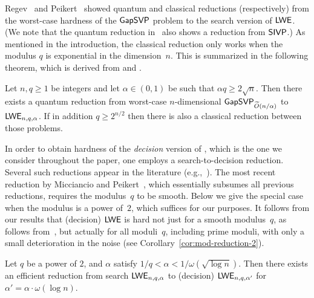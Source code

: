 Regev~\cite{DBLP:journals/jacm/Regev09} and Peikert~\cite{DBLP:conf/stoc/Peikert09} showed quantum and classical reductions (respectively) from the worst-case hardness of the $\mathsf{GapSVP}$ problem to the search version of $\mathsf{LWE}$. 
(We note that the quantum reduction in~\cite{DBLP:journals/jacm/Regev09} also shows a reduction from $\mathsf{SIVP}$.)
As mentioned in the introduction, the classical reduction only works when the modulus $q$ is exponential
in the dimension~$n$.
This is summarized in the following theorem, which is derived from
{{\cite[Theorem~3.1]{DBLP:journals/jacm/Regev09}}} and
{{\cite[Theorem~3.1]{DBLP:conf/stoc/Peikert09}}}.

\begin{theorem}\label{thm:worstcaseaveragecase}
Let $n, q \ge 1$ be integers and let $\alpha \in (0,1)$ be such that $\alpha q \ge 2 \sqrt{n}$. Then there exists a quantum reduction from worst-case $n$-dimensional $\mathsf{GapSVP}_{\widetilde{O}(n/\alpha)}$ to $\mathsf{LWE}_{n,q,\alpha}$. If in addition $q \ge 2^{n/2}$ then there is also a classical reduction between those problems. 
\end{theorem}

In order to obtain hardness of the \emph{decision} version of \lwe, which is the one we consider throughout the paper, one employs a search-to-decision reduction. Several such reductions appear in the literature (e.g.,~\cite{DBLP:journals/jacm/Regev09,DBLP:conf/stoc/Peikert09,DBLP:conf/eurocrypt/MicciancioP12}). The most recent reduction by Micciancio and Peikert~\cite{DBLP:conf/eurocrypt/MicciancioP12}, which essentially subsumes all previous reductions, 
requires the modulus~$q$ to be smooth. Below we give the special case when the modulus is a power of~$2$, which suffices for our purposes. It follows from our results that (decision) $\mathsf{LWE}$ is hard not just for a smooth modulus~$q$, as follows from~\cite{DBLP:conf/eurocrypt/MicciancioP12}, but actually for all moduli~$q$, including prime moduli, with only a small deterioration in the noise
(see Corollary~\ref{cor:mod-reduction-2}).

\begin{theorem}\label{thm:searchtodecisionmicpei}
Let $q$ be a power of $2$, and $\alpha$ satisfy $1/q < \alpha < 1/\omega(\sqrt{\log n})$. Then there exists an efficient reduction from search $\mathsf{LWE}_{n,q,\alpha}$
to (decision) $\mathsf{LWE}_{n,q,\alpha'}$ for $\alpha'=\alpha \cdot \omega(\log n)$.
\end{theorem}





